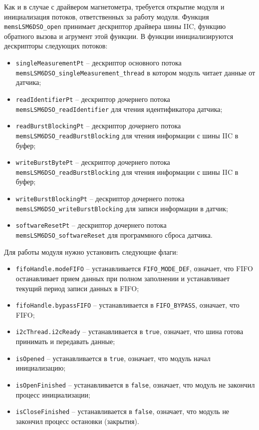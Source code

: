 Как и в случае с драйвером магнетометра, требуется открытие модуля и инициализация потоков, ответственных за
работу модуля. Функция \lstinline{memsLSM6DSO_open} принимает дескриптор драйвера шины IIC, функцию обратного вызова
и агрумент этой функции. В функции инициализируются дескрипторы следующих потоков:

\begin{itemize}
    \item \lstinline{singleMeasurementPt} -- дескриптор основного потока \lstinline{memsLSM6DSO_singleMeasurement_thread} в котором модуль читает данные от датчика;
    \item \lstinline{readIdentifierPt} -- дескриптор дочернего потока \lstinline{memsLSM6DSO_readIdentifier} для чтения идентификатора датчика;
    \item \lstinline{readBurstBlockingPt} --  дескриптор дочернего потока \lstinline{memsLSM6DSO_readBurstBlocking} для чтения информации с шины IIC в буфер;
    \item \lstinline{writeBurstBytePt} --  дескриптор дочернего потока \lstinline{memsLSM6DSO_readBurstBlocking} для чтения информации с шины IIC в буфер;
    \item \lstinline{writeBurstBlockingPt} --  дескриптор дочернего потока \lstinline{memsLSM6DSO_writeBurstBlocking} для записи информации в датчик;
    \item \lstinline{softwareResetPt} --  дескриптор дочернего потока \lstinline{memsLSM6DSO_softwareReset} для программного сброса датчика.
\end{itemize}

Для работы модуля нужно установить следующие флаги:

\begin{itemize}
    \item \lstinline{fifoHandle.modeFIFO} -- устанавливается \lstinline{FIFO_MODE_DEF},
    означает, что FIFO останавливает прием данных при полном заполнении и устанавливает текущий период записи данных в FIFO;
    \item \lstinline{fifoHandle.bypassFIFO} -- устанавливается в \lstinline{FIFO_BYPASS}, означает, что FIFO;
    \item \lstinline{i2cThread.i2cReady} -- устанавливается в \lstinline{true}, означает, что шина готова принимать и передавать данные;
    \item \lstinline{isOpened} -- устанавливается в \lstinline{true}, означает, что модуль начал инициализацию;
    \item \lstinline{isOpenFinished} -- устанавливается в \lstinline{false}, означает, что модуль не закончил процесс инициализации;
    \item \lstinline{isCloseFinished} -- устанавливается в \lstinline{false}, означает, что модуль не закончил процесс остановки (закрытия).
\end{itemize}


